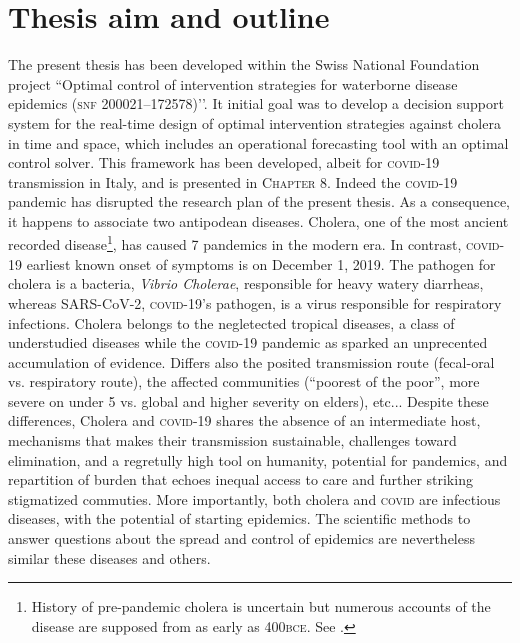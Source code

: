 \section{Thesis aim and outline} 
The present thesis has been developed within the Swiss National Foundation project ``Optimal control of intervention strategies for waterborne disease epidemics (\textsc{snf} 200021–172578)’’. It initial goal was to develop a decision support system for the real-time design of optimal intervention strategies against cholera in time and space, which includes an operational forecasting tool with an optimal control solver. This framework has been developed, albeit for \textsc{covid}-19 transmission in Italy, and is presented in \textsc{Chapter 8}. Indeed the \textsc{covid}-19 pandemic has disrupted the research plan of the present thesis. As a consequence, it happens to associate two antipodean diseases. Cholera, one of the most ancient recorded disease\footnote[][10\baselineskip]{History of pre-pandemic cholera is uncertain but numerous accounts of the disease are supposed from as early as 400\textsc{bce}. See .}, has caused 7 pandemics in the modern era. In contrast, \textsc{covid}-19 earliest known onset of symptoms is on December 1, 2019. The pathogen for cholera is a bacteria, \textit{Vibrio Cholerae}, responsible for heavy watery diarrheas, whereas SARS-CoV-2, \textsc{covid}-19’s pathogen, is a virus responsible for respiratory infections. Cholera belongs to the negletected tropical diseases, a class of understudied diseases while the \textsc{covid}-19 pandemic as sparked an unprecented accumulation of evidence\cite{COVID-19OpenAccessProject:LivingEvidenceCOVID19:2020}. Differs also the posited transmission route (fecal-oral vs. respiratory route), the affected communities (``poorest of the poor”, more severe on under 5 vs. global and higher severity on elders), etc... Despite these differences, Cholera and \textsc{covid}-19 shares the absence of an intermediate host, mechanisms that makes their transmission sustainable, challenges toward elimination, and a regretully high tool on humanity, potential for pandemics, and repartition of burden that echoes inequal access to care and further striking stigmatized commuties. More importantly, both cholera and \textsc{covid} are infectious diseases, with the potential of starting epidemics. The scientific methods to answer questions about the spread and control of epidemics are nevertheless similar these diseases and others.



